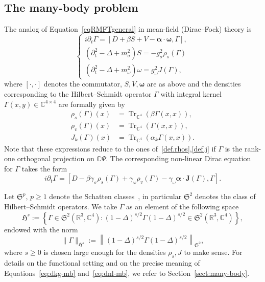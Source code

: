 \documentclass[10pt]{amsart}
\theoremstyle{definition}\newtheorem{defi}[theo]{Definition}\newtheorem{rema}[theo]{Remark}\newtheorem{exam}[theo]{Example}\newtheorem{exem}[theo]{Example}\newtheorem{nota}[theo]{Notation}
\DeclareMathOperator{\Tr}{Tr}
\newcommand\R{\mathbb{R}}
\newcommand\C{\mathbb{C}}
\newcommand{\gS}{\mathfrak{S}}
\newcommand{\gH}{\mathfrak{H}}
\begin{document}
\subsection{The many-body problem}


The analog of Equation~\eqref{eqRMFTgeneral} in mean-field (Dirac--Fock) theory is
\begin{equation}\label{eq:dkg-mb}
\begin{cases}
i\partial_t\Gamma = [D+{ \beta}S + V - {\bm \alpha}\cdot {\bm \omega},\Gamma],\\
\left(\partial^2_t-\Delta+m_\sigma^2\right)S=-g_\sigma^2\rho_s(\Gamma)\\
\left(\partial^2_t-\Delta+m_\omega^2\right)\omega=g_\omega^2 J(\Gamma),
\end{cases}
\end{equation}
where $[\cdot, \cdot]$ denotes the commutator, $S, V, {\bm \omega}$ are as above and the densities corresponding to the Hilbert--Schmidt operator $\Gamma$ with integral kernel $\Gamma(x,y)\in \C^{4\times 4}$ are formally given by
\begin{align}
\rho_s(\Gamma)(x)&= \Tr_{\C^4}(\beta \Gamma(x,x)), \label{eq:rho-s-def}
\\
\rho_v(\Gamma)(x)&= \Tr_{\C^4}(\Gamma(x,x)), \label{eq:rho-v-def}
\\
J_k(\Gamma)(x)&=\Tr_{\C^4}(\alpha_k\Gamma(x,x)). \label{eq:rho-J-def}
\end{align}
Note that these expressions reduce to the ones of~\eqref{def.rhos},\eqref{def.j} if $\Gamma$ is the rank-one orthogonal projection on $\C\Psi$. The corresponding non-linear Dirac equation for $\Gamma$ takes the form
\begin{equation}\label{eq:dnl-mb}
i\partial_t\Gamma = \left[D - { \beta}\gamma_\sigma \rho_s(\Gamma) + \gamma_\omega \rho_v(\Gamma) - \gamma_\omega {\bm \alpha}\cdot {\bm J}(\Gamma), \Gamma \right].
\end{equation}


Let $\gS^p$, $p\geq 1$ denote the Schatten classes~\cite{simontrace}, in particular $\gS^2$ denotes the class of Hilbert--Schmidt operators. We take $\Gamma$ as an element of the following space
\begin{equation}\label{eq:H^s-op}
\gH^s:=\left\{\Gamma \in \gS^2\left(\R^3, \C^4\right): (1-\Delta)^{s/2}\Gamma(1-\Delta)^{s/2} \in \gS^2\left(\R^3, \C^4\right)\right\},
\end{equation}
endowed with the norm
\begin{equation}\label{eq:norm-H^s-op}
\|\Gamma\|_{\gH^s} := \left\| (1-\Delta)^{s/2}\Gamma(1-\Delta)^{s/2} \right\|_{\gS^2},
\end{equation}
where $s\geq 0$ is chosen large enough for the densities $\rho_s, J$ to make sense. For details on the functional setting and on the precise meaning of Equations~\eqref{eq:dkg-mb} and~\eqref{eq:dnl-mb}, we refer to Section~\ref{sect:many-body}.
\end{document}
